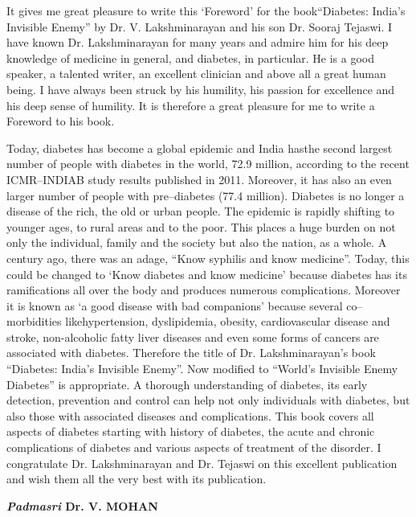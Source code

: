 It gives me great pleasure to write this ‘Foreword’ for the book\break “Diabetes: India's Invisible Enemy” by Dr. V. Lakshminara\-yan and his son Dr. Sooraj Tejaswi. I have known Dr. Lakshminarayan for many years and admire him for his deep knowledge of medicine in general, and diabetes, in particular. He is a good speaker, a talented writer, an excellent clinician and above all a great human being. I have always been struck by his humi\-lity, his passion for excellence and his deep sense of humility. It is therefore a great pleasure for me to write a Foreword to his book.

Today, diabetes has become a global epidemic and India has\break the second largest number of people with diabetes in the world, 72.9 million, according to the recent ICMR–INDIAB study results published in 2011. Moreover, it has also an even larger number of people with pre–diabetes (77.4 million). Diabetes is no longer a disease of the rich, the old or urban people. The epidemic is rapidly shifting to younger ages, to rural areas and to the poor. This places a huge burden on not only the individual, family and the society but also the nation, as a whole. A century ago, there was an adage, “Know syphilis and know medicine”. Today, this could be changed to ‘Know diabetes and know medicine’ because diabetes has its ramifications all over the body and produces numerous complications. Moreover it is known as ‘a good di\-sease with bad companions’ because several co–morbidities like\break hypertension, dyslipidemia, obesity, cardiovascular disease and stroke, non-alcoholic fatty liver diseases and even some forms of cancers are associated with diabetes. Therefore the title of Dr. Lakshminarayan’s book “Diabetes: India's Invisible Enemy”. Now modified to “World's Invisible Enemy Diabetes” is appropriate. A thorough understanding of diabetes, its early detection, prevention and control can help not only individuals with diabetes, but also those with associated diseases and compli\-cations. This book covers all aspects of diabetes starting with history of diabetes, the acute and chronic complications of diabetes and various aspects of treatment of the disorder. I congra\-tulate Dr. Lakshminarayan and Dr. Tejaswi on this exce\-llent publication and wish them all the very best with its publication.

\begin{flushright}
\textbf{\textit{\small{Padmasri}} Dr. V. MOHAN}
\end{flushright}

